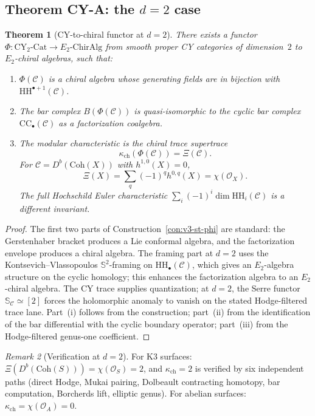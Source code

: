 \documentclass[11pt]{article}
\theoremstyle{plain}
\newtheorem{theorem}{Theorem}[section]
\theoremstyle{definition}
\theoremstyle{remark}
\newtheorem{remark}[theorem]{Remark}
\newcommand{\cC}{\mathcal{C}}
\newcommand{\cO}{\mathcal{O}}
\newcommand{\bS}{\mathbb{S}}
\newcommand{\Etwo}{E_2}
\newcommand{\HH}{\mathrm{HH}}
\newcommand{\CC}{\mathrm{CC}}
\newcommand{\CY}{\mathrm{CY}}
\newcommand{\Coh}{\mathrm{Coh}}
\begin{document}
\subsection{Theorem CY-A: the $d = 2$ case}

\begin{theorem}[CY-to-chiral functor at $d = 2$]
\label{thm:v3-st-cy-a2}
There exists a functor
$\Phi \colon \CY_2\text{-}\mathrm{Cat} \to
\Etwo\text{-}\mathrm{ChirAlg}$
from smooth proper CY categories of dimension~$2$ to
$\Etwo$-chiral algebras, such that:
\begin{enumerate}[label=(\roman*)]
 \item $\Phi(\cC)$ is a chiral algebra whose generating fields are
 in bijection with $\HH^{\bullet+1}(\cC)$.
 \item The bar complex $B(\Phi(\cC))$ is quasi-isomorphic to the
 cyclic bar complex $\CC_\bullet(\cC)$ as a factorization
 coalgebra.
 \item The modular characteristic is the chiral trace supertrace
 \[
  \kappa_{\mathrm{ch}}(\Phi(\cC))=\Xi(\cC).
 \]
 For $\cC=D^b(\Coh(X))$ with $h^{1,0}(X)=0$,
 \[
  \Xi(X)=\sum_q(-1)^q h^{0,q}(X)=\chi(\cO_X).
 \]
 The full Hochschild Euler characteristic
 $\sum_i(-1)^i\dim\HH_i(\cC)$ is a different invariant.
\end{enumerate}
\end{theorem}

\begin{proof}
The first two parts of Construction~\ref{con:v3-st-phi} are standard: the
Gerstenhaber bracket produces a Lie conformal algebra, and the
factorization envelope produces a chiral algebra.  The framing part at
$d = 2$ uses the Kontsevich--Vlassopoulos $\bS^2$-framing on
$\HH_\bullet(\cC)$, which gives an $\Etwo$-algebra structure on
the cyclic homology; this enhances the factorization algebra to an
$\Etwo$-chiral algebra.  The CY trace supplies quantization; at
$d = 2$, the Serre functor $\bS_\cC \simeq [2]$ forces the
holomorphic anomaly to vanish on the stated Hodge-filtered trace
lane.  Part~(i) follows from the construction; part~(ii) from the
identification of the bar differential with the cyclic boundary
operator; part~(iii) from the Hodge-filtered genus-one coefficient.
\end{proof}

\begin{remark}[Verification at $d = 2$]
\label{rem:v3-st-d2-verification}
For K3 surfaces: $\Xi(D^b(\Coh(S))) = \chi(\cO_S) = 2$,
and $\kappa_{\mathrm{ch}} = 2$ is verified by six independent
paths (direct Hodge, Mukai pairing, Dolbeault contracting
homotopy, bar computation, Borcherds lift, elliptic genus).  For
abelian surfaces: $\kappa_{\mathrm{ch}} = \chi(\cO_A) = 0$.
\end{remark}
\end{document}
